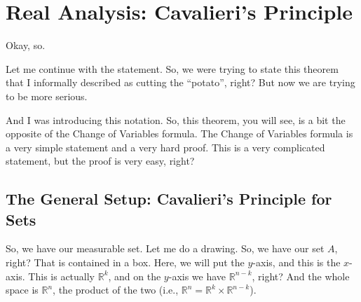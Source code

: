 \chapter{Real Analysis: Cavalieri's Principle}

\begin{spoken-clean}[00:00:00 - 00:00:04]
Okay, so.
\end{spoken-clean}

\begin{spoken-clean}[00:00:04 - 00:00:10]
Let me continue with the statement. So, we were trying to state this theorem that I informally described as cutting the ``potato'', right? But now we are trying to be more serious.
\end{spoken-clean}

\begin{spoken-clean}[00:00:10 - 00:00:19]
And I was introducing this notation. So, this theorem, you will see, is a bit the opposite of the Change of Variables formula. The Change of Variables formula is a very simple statement and a very hard proof. This is a very complicated statement, but the proof is very easy, right?
\end{spoken-clean}

\section{The General Setup: Cavalieri's Principle for Sets}

\begin{spoken-clean}[00:00:19 - 00:00:39]
So, we have our measurable set. Let me do a drawing. So, we have our set $A$, right? That is contained in a box. Here, we will put the $y$-axis, and this is the $x$-axis. This is actually $\mathbb{R}^k$, and on the $y$-axis we have $\mathbb{R}^{n-k}$, right? And the whole space is $\mathbb{R}^n$, the product of the two (i.e., $\mathbb{R}^n = \mathbb{R}^k \times \mathbb{R}^{n-k}$).
\end{spoken-clean}

